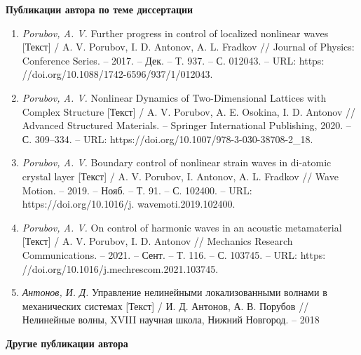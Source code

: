 \vspace{5pt}

\begin{center}\textbf{Публикации автора по теме диссертации}\end{center}

\begin{enumerate}
\item \textit{Porubov, A. V.} Further progress in control of localized nonlinear waves
[Текст] / A. V. Porubov, I. D. Antonov, A. L. Fradkov // Journal of Physics:
Conference Series. -- 2017. -- Дек. -- Т. 937. -- С. 012043. -- URL: https:
//doi.org/10.1088/1742-6596/937/1/012043.	
	
\item \textit{Porubov, A. V.} Nonlinear Dynamics of Two-Dimensional Lattices with
Complex Structure [Текст] / A. V. Porubov, A. E. Osokina, I. D. Antonov //
Advanced Structured Materials. -- Springer International Publishing, 2020. --
С. 309--334. -- URL: https://doi.org/10.1007/978-3-030-38708-2\_18.

\item \textit{Porubov, A. V.} Boundary control of nonlinear strain waves in di-atomic crystal
layer [Текст] / A. V. Porubov, I. Antonov, A. L. Fradkov // Wave Motion. --
2019. -- Нояб. -- Т. 91. -- С. 102400. -- URL: https://doi.org/10.1016/j.
wavemoti.2019.102400.

\item \textit{Porubov, A. V.} On control of harmonic waves in an acoustic metamaterial
[Текст] / A. V. Porubov, I. D. Antonov // Mechanics Research
Communications. -- 2021. -- Сент. -- Т. 116. -- С. 103745. -- URL: https:
//doi.org/10.1016/j.mechrescom.2021.103745.

\item \textit{Антонов, И. Д.} Управление нелинейными локализованными волнами в
механических системах [Текст] / И. Д. Антонов, А. В. Порубов // Нелинейные волны, XVIII научная школа, Нижний Новгород. -- 2018
\end{enumerate}

\vspace{5pt}

\begin{center}\textbf{Другие публикации автора}\end{center}

